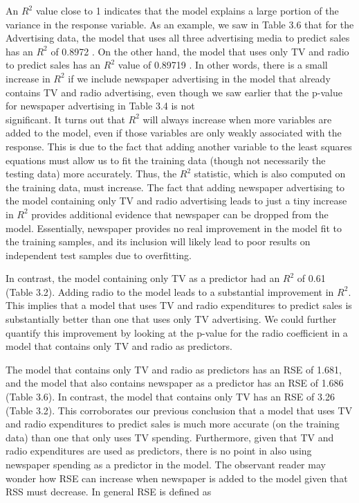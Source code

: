 \documentclass[10pt]{article}
\begin{document}
An $R^{2}$ value close to 1 indicates that the model explains a large portion of the variance in the response variable. As an example, we saw in Table 3.6 that for the Advertising data, the model that uses all three advertising media to predict sales has an $R^{2}$ of 0.8972 . On the other hand, the model that uses only TV and radio to predict sales has an $R^{2}$ value of 0.89719 . In other words, there is a small increase in $R^{2}$ if we include newspaper advertising in the model that already contains TV and radio advertising, even though we saw earlier that the p-value for newspaper advertising in Table 3.4 is not\\
significant. It turns out that $R^{2}$ will always increase when more variables are added to the model, even if those variables are only weakly associated with the response. This is due to the fact that adding another variable to the least squares equations must allow us to fit the training data (though not necessarily the testing data) more accurately. Thus, the $R^{2}$ statistic, which is also computed on the training data, must increase. The fact that adding newspaper advertising to the model containing only TV and radio advertising leads to just a tiny increase in $R^{2}$ provides additional evidence that newspaper can be dropped from the model. Essentially, newspaper provides no real improvement in the model fit to the training samples, and its inclusion will likely lead to poor results on independent test samples due to overfitting.

In contrast, the model containing only TV as a predictor had an $R^{2}$ of 0.61 (Table 3.2). Adding radio to the model leads to a substantial improvement in $R^{2}$. This implies that a model that uses TV and radio expenditures to predict sales is substantially better than one that uses only TV advertising. We could further quantify this improvement by looking at the p-value for the radio coefficient in a model that contains only TV and radio as predictors.

The model that contains only TV and radio as predictors has an RSE of 1.681, and the model that also contains newspaper as a predictor has an RSE of 1.686 (Table 3.6). In contrast, the model that contains only TV has an RSE of 3.26 (Table 3.2). This corroborates our previous conclusion that a model that uses TV and radio expenditures to predict sales is much more accurate (on the training data) than one that only uses TV spending. Furthermore, given that TV and radio expenditures are used as predictors, there is no point in also using newspaper spending as a predictor in the model. The observant reader may wonder how RSE can increase when newspaper is added to the model given that RSS must decrease. In general RSE is defined as
\end{document}
